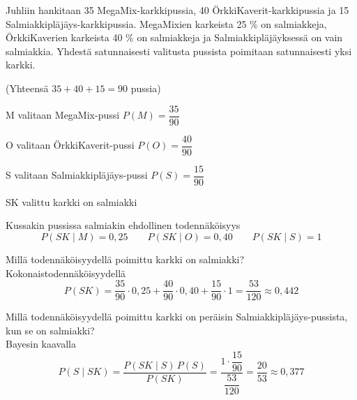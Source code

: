 \documentclass[12pt,a4paper]{article}
\begin{document}
\newpage
{}
Juhliin hankitaan 35 MegaMix-karkkipussia, 
40 ÖrkkiKaverit-karkkipussia ja 
15 Salmiakkipläjäys-karkkipussia. 
MegaMixien karkeista 25 \% on salmiakkeja, 
ÖrkkiKaverien karkeista 40 \% on salmiakkeja ja 
Salmiakkipläjäyksessä on vain salmiakkia. 
Yhdestä satunnaisesti valitusta pussista poimitaan 
satunnaisesti yksi karkki.
\vspace{0.4cm}

(Yhteensä $35+40+15 = 90$ pussia)


\begin{kuvaus}
  \item[M] valitaan MegaMix-pussi \Rightarrow   $P(M)=\dfrac{35}{90}$
  \item[O] valitaan ÖrkkiKaverit-pussi \Rightarrow  $P(O)=\dfrac{40}{90}$
  \item[S] valitaan Salmiakkipläjäys-pussi \Rightarrow  $P(S)=\dfrac{15}{90}$
  \item[SK] valittu karkki on salmiakki
\end{kuvaus}

Kussakin pussissa salmiakin ehdollinen todennäköisyys
\[
P(SK\mid M)=0{,}25\qquad
P(SK\mid O)=0{,}40\qquad
P(SK\mid S)=1
\]

\begin{kohta}
  \item Millä todennäköisyydellä poimittu karkki on salmiakki?\\[12pt]
  Kokonaistodennäköisyydellä
  \[
    P(SK)=\!
      \frac{35}{90}\cdot 0{,}25
    + \frac{40}{90}\cdot 0{,}40
    + \frac{15}{90}\cdot 1
    =\frac{53}{120}\approx 0{,}442
  \]

  \item Millä todennäköisyydellä poimittu karkki on peräisin Salmiakkipläjäys-pussista, kun se on salmiakki?\\[12pt]
  Bayesin kaavalla
  \[
    P(S\mid SK)
    =\frac{P(SK\mid S)\,P(S)}{P(SK)}
    =\frac{1\cdot\dfrac{15}{90}}{\dfrac{53}{120}}
    =\frac{20}{53}\approx 0{,}377
  \]
\end{kohta}
\end{document}
